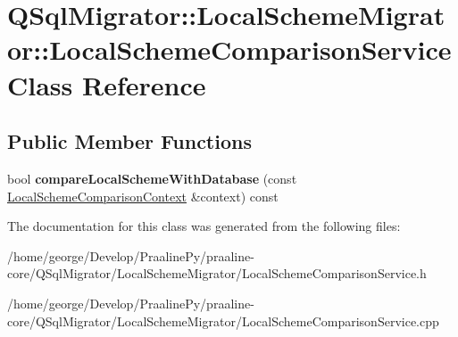 \hypertarget{class_q_sql_migrator_1_1_local_scheme_migrator_1_1_local_scheme_comparison_service}{}\section{Q\+Sql\+Migrator\+:\+:Local\+Scheme\+Migrator\+:\+:Local\+Scheme\+Comparison\+Service Class Reference}
\label{class_q_sql_migrator_1_1_local_scheme_migrator_1_1_local_scheme_comparison_service}
\subsection*{Public Member Functions}
\begin{DoxyCompactItemize}
\item 
\mbox{\label{class_q_sql_migrator_1_1_local_scheme_migrator_1_1_local_scheme_comparison_service_abfc3d6b11a19299bc5c049b3c21b7bbc}} 
bool {\bfseries compare\+Local\+Scheme\+With\+Database} (const \hyperlink{class_q_sql_migrator_1_1_local_scheme_migrator_1_1_local_scheme_comparison_context}{Local\+Scheme\+Comparison\+Context} \&context) const
\end{DoxyCompactItemize}


The documentation for this class was generated from the following files\+:\begin{DoxyCompactItemize}
\item 
/home/george/\+Develop/\+Praaline\+Py/praaline-\/core/\+Q\+Sql\+Migrator/\+Local\+Scheme\+Migrator/Local\+Scheme\+Comparison\+Service.\+h\item 
/home/george/\+Develop/\+Praaline\+Py/praaline-\/core/\+Q\+Sql\+Migrator/\+Local\+Scheme\+Migrator/Local\+Scheme\+Comparison\+Service.\+cpp\end{DoxyCompactItemize}

